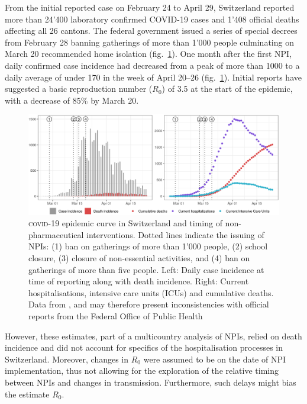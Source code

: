 From the initial reported case on February 24 to April 29, Switzerland reported more than 24'400 laboratory confirmed COVID-19 cases and 1'408 official deaths affecting all 26 cantons\cite{OFSP:RapportSituationEpidemiologique:2020}. The federal government issued a series of special decrees from February 28 banning gatherings of more than 1'000 people culminating on March 20 recommended home isolation (fig.~\ref{fig:covid-ch-data}). One month after the first NPI, daily confirmed case incidence had decreased from a peak of more than 1000 to a daily average of under 170 in the week of April 20–26 (fig.~\ref{fig:covid-ch-data}). Initial reports have suggested a basic reproduction number ($R_0$) of 3.5 at the start of the epidemic, with a decrease of 85\% by March 20\cite[-3\baselineskip]{Flaxman:Report13Estimating:2020}.
\begin{figure}\centering
  \includegraphics[width=\textwidth]{fig_covid-switzerland-npi/FIGURE_1.png}
  \caption[\textsc{covid}-19 epidemic curve in Switzerland and timing of interventions]{\textsc{covid}-19 epidemic curve in Switzerland and timing of non-pharmaceutical interventions. Dotted lines indicate the issuing of NPIs: (1) ban on gatherings of more than 1'000 people, (2) school closure, (3) closure of non-essential activities, and (4) ban on gatherings of more than five people. Left: Daily case incidence at time of reporting along with death incidence. Right: Current hospitalisations, intensive care units (ICUs) and cumulative deaths. Data from \textcite{Probst:DaenuprobstCovid19casesswitzerland:2020}, and may therefore present inconsistencies with official reports from the Federal Office of Public Health%
  }
  \label{fig:covid-ch-data}
\end{figure}
 However, these estimates, part of a multicountry analysis of NPIs, relied on death incidence and did not account for specifics of the hospitalisation processes in Switzerland. Moreover, changes in $R_0$ were assumed to be on the date of NPI implementation, thus not allowing for the exploration of the relative timing between NPIs and changes in transmission. Furthermore, such delays might bias the estimate $R_0$. 

